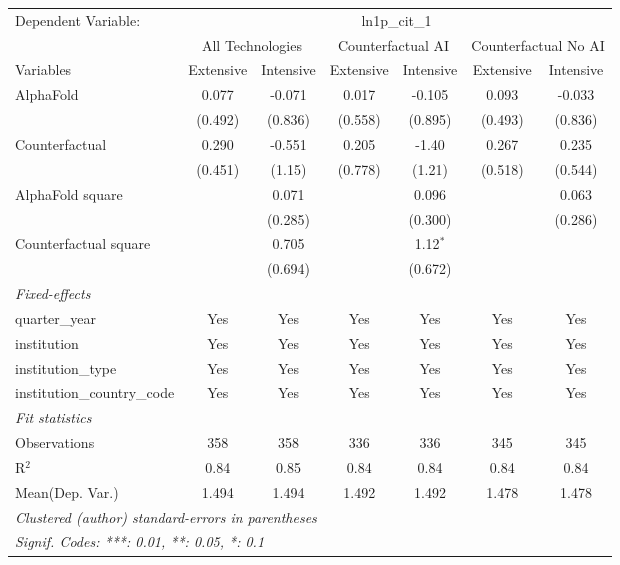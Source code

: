 \begingroup
\centering
\begin{tabular}{lcccccc}
   \tabularnewline \midrule \midrule
   Dependent Variable: & \multicolumn{6}{c}{ln1p\_cit\_1}\\
 & \multicolumn{2}{c}{All Technologies} & \multicolumn{2}{c}{Counterfactual AI} & \multicolumn{2}{c}{Counterfactual No AI} \\
\cmidrule(lr){1-1}\cmidrule(lr){2-3} \cmidrule(lr){4-5} \cmidrule(lr){6-7}
Variables & \multicolumn{1}{c}{Extensive} & \multicolumn{1}{c}{Intensive} & \multicolumn{1}{c}{Extensive} & \multicolumn{1}{c}{Intensive} & \multicolumn{1}{c}{Extensive} & \multicolumn{1}{c}{Intensive} \\
\cmidrule(lr){1-1}\cmidrule(lr){2-2} \cmidrule(lr){3-3} \cmidrule(lr){4-4} \cmidrule(lr){5-5} \cmidrule(lr){6-6} \cmidrule(lr){7-7}
   AlphaFold                    & 0.077   & -0.071  & 0.017   & -0.105     & 0.093   & -0.033\\   
                                & (0.492) & (0.836) & (0.558) & (0.895)    & (0.493) & (0.836)\\   
   Counterfactual               & 0.290   & -0.551  & 0.205   & -1.40      & 0.267   & 0.235\\   
                                & (0.451) & (1.15)  & (0.778) & (1.21)     & (0.518) & (0.544)\\   
   AlphaFold square             &         & 0.071   &         & 0.096      &         & 0.063\\   
                                &         & (0.285) &         & (0.300)    &         & (0.286)\\   
   Counterfactual square        &         & 0.705   &         & 1.12$^{*}$ &         &   \\   
                                &         & (0.694) &         & (0.672)    &         &   \\   
   \midrule
   \emph{Fixed-effects}\\
   quarter\_year                & Yes     & Yes     & Yes     & Yes        & Yes     & Yes\\  
   institution                  & Yes     & Yes     & Yes     & Yes        & Yes     & Yes\\  
   institution\_type            & Yes     & Yes     & Yes     & Yes        & Yes     & Yes\\  
   institution\_country\_code   & Yes     & Yes     & Yes     & Yes        & Yes     & Yes\\  
   \midrule
   \emph{Fit statistics}\\
   Observations                 & 358     & 358     & 336     & 336        & 345     & 345\\  
   R$^2$                        & 0.84    & 0.85    & 0.84    & 0.84       & 0.84    & 0.84\\  
Mean(Dep. Var.) & 1.494 & 1.494 & 1.492 & 1.492 & 1.478 & 1.478 \\
   \midrule \midrule
   \multicolumn{7}{l}{\emph{Clustered (author) standard-errors in parentheses}}\\
   \multicolumn{7}{l}{\emph{Signif. Codes: ***: 0.01, **: 0.05, *: 0.1}}\\
\end{tabular}
\par\endgroup
